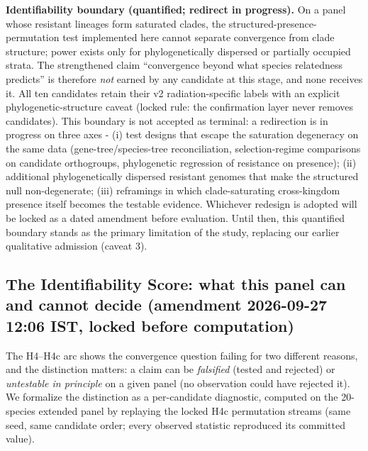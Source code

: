 \documentclass[12pt,a4paper]{article}
\begin{document}
\textbf{Identifiability boundary (quantified; redirect in progress).} On a panel whose resistant lineages form saturated clades, the structured-presence-permutation test implemented here cannot separate convergence from clade structure; power exists only for phylogenetically dispersed or partially occupied strata. The strengthened claim ``convergence beyond what species relatedness predicts'' is therefore \emph{not} earned by any candidate at this stage, and none receives it. All ten candidates retain their v2 radiation-specific labels with an explicit phylogenetic-structure caveat (locked rule: the confirmation layer never removes candidates). This boundary is not accepted as terminal: a redirection is in progress on three axes - (i) test designs that escape the saturation degeneracy on the same data (gene-tree/species-tree reconciliation, selection-regime comparisons on candidate orthogroups, phylogenetic regression of resistance on presence); (ii) additional phylogenetically dispersed resistant genomes that make the structured null non-degenerate; (iii) reframings in which clade-saturating cross-kingdom presence itself becomes the testable evidence. Whichever redesign is adopted will be locked as a dated amendment before evaluation. Until then, this quantified boundary stands as the primary limitation of the study, replacing our earlier qualitative admission (caveat 3).

\subsection{The Identifiability Score: what this panel can and cannot decide (amendment 2026-09-27 12:06 IST, locked before computation)}
The H4--H4c arc shows the convergence question failing for two different reasons, and the distinction matters: a claim can be \emph{falsified} (tested and rejected) or \emph{untestable in principle} on a given panel (no observation could have rejected it). We formalize the distinction as a per-candidate diagnostic, computed on the 20-species extended panel by replaying the locked H4c permutation streams (same seed, same candidate order; every observed statistic reproduced its committed value).
\end{document}
